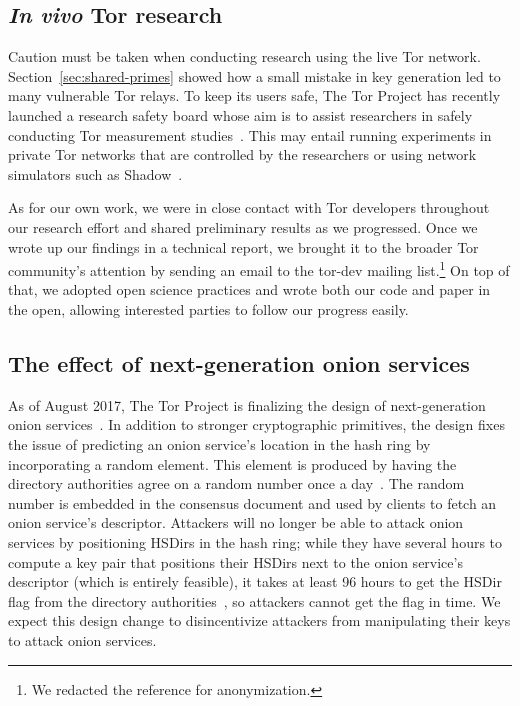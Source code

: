 \subsection{\textit{In vivo} Tor research}
Caution must be taken when conducting research using the live Tor network.
Section~\ref{sec:shared-primes} showed how a small mistake in key generation led
to many vulnerable Tor relays.  To keep its users safe, The Tor Project has
recently launched a research safety board whose aim is to assist researchers in
safely conducting Tor measurement studies~\cite{safety-board}.  This may entail
running experiments in private Tor networks that are controlled by the
researchers or using network simulators such as Shadow~\cite{Jansen2012a}.

As for our own work, we were in close contact with Tor developers throughout our
research effort and shared preliminary results as we progressed.  Once we wrote
up our findings in a technical report, we brought it to the broader Tor
community's attention by sending an email to the tor-dev mailing
list.\footnote{We redacted the reference for anonymization.}  On top of that, we
adopted open science practices and wrote both our code and paper in the open,
allowing interested parties to follow our progress easily.

\subsection{The effect of next-generation onion services}
As of August 2017, The Tor Project is finalizing the design of next-generation
onion services~\cite{prop224}.  In addition to stronger cryptographic
primitives, the design fixes the issue of predicting an onion service's location
in the hash ring by incorporating a random element.  This element is produced by
having the directory authorities agree on a random number once a
day~\cite{prop250}.  The random number is embedded in the consensus document and
used by clients to fetch an onion service's descriptor.  Attackers will no
longer be able to attack onion services by positioning HSDirs in the hash ring;
while they have several hours to compute a key pair that positions their HSDirs
next to the onion service's descriptor (which is entirely feasible), it takes at
least 96 hours to get the HSDir flag from the directory
authorities~\cite[\S~3.4.2]{dir-spec}, so attackers cannot get the flag in time.
We expect this design change to disincentivize attackers from manipulating their
keys to attack onion services.
